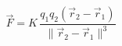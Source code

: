 \documentclass[preview]{standalone}
\begin{document}
\begin{align*}
\vec{F} = K \, \dfrac{q_1 q_2 (\vec{r}_2 - \vec{r}_1)}{\lVert \vec{r}_2 - \vec{r}_1 \rVert^3}
\end{align*}
\end{document}
